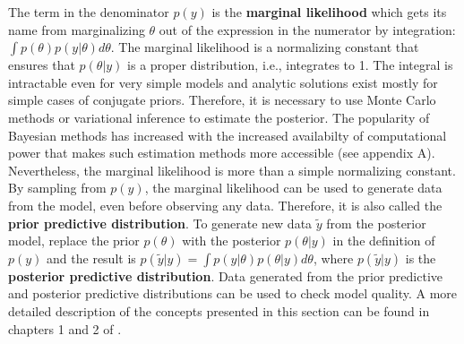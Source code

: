 The term in the denominator $p(y)$ is the \textbf{marginal likelihood} which gets its name from marginalizing $\theta$ out of the expression in the numerator by integration: $\int p(\theta) p(y|\theta)d\theta$.
The marginal likelihood is a normalizing constant that ensures that $p(\theta|y)$ is a proper distribution, i.e., integrates to 1.
The integral is intractable even for very simple models and analytic solutions exist mostly for simple cases of conjugate priors.
Therefore, it is necessary to use Monte Carlo methods or variational inference to estimate the posterior.
The popularity of Bayesian methods has increased with the increased availabilty of computational power that makes such estimation methods more accessible (see appendix A).
Nevertheless, the marginal likelihood is more than a simple normalizing constant.
By sampling from $p(y)$, the marginal likelihood can be used to generate data from the model, even before observing any data.
Therefore, it is also called the \textbf{prior predictive distribution}.
To generate new data  $\tilde y$ from the posterior model, replace the prior $p(\theta)$ with the posterior $p(\theta|y)$ in the definition of $p(y)$ and the result is $p(\tilde y|y) = \int p(y | \theta) p(\theta|y) d\theta$, where $p(\tilde y | y)$ is the \textbf{posterior predictive distribution}.
Data generated from the prior predictive and posterior predictive distributions can be used to check model quality.
A more detailed description of the concepts presented in this section can be found in chapters 1 and 2 of \cite{gelman_bayesian_2014}.

